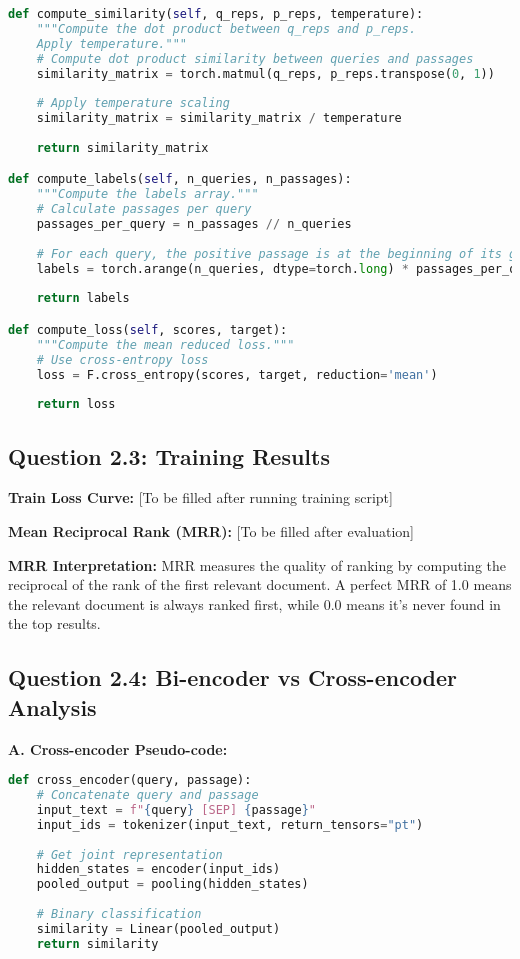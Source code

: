 \documentclass[11pt]{article}
\begin{document}
\begin{lstlisting}[language=Python]
def compute_similarity(self, q_reps, p_reps, temperature):
    """Compute the dot product between q_reps and p_reps.
    Apply temperature."""
    # Compute dot product similarity between queries and passages
    similarity_matrix = torch.matmul(q_reps, p_reps.transpose(0, 1))
    
    # Apply temperature scaling
    similarity_matrix = similarity_matrix / temperature
    
    return similarity_matrix

def compute_labels(self, n_queries, n_passages):
    """Compute the labels array."""
    # Calculate passages per query
    passages_per_query = n_passages // n_queries
    
    # For each query, the positive passage is at the beginning of its group
    labels = torch.arange(n_queries, dtype=torch.long) * passages_per_query
    
    return labels

def compute_loss(self, scores, target):
    """Compute the mean reduced loss."""
    # Use cross-entropy loss
    loss = F.cross_entropy(scores, target, reduction='mean')
    
    return loss
\end{lstlisting}

\subsection{Question 2.3: Training Results}

\textbf{Train Loss Curve:} [To be filled after running training script]

\textbf{Mean Reciprocal Rank (MRR):} [To be filled after evaluation]

\textbf{MRR Interpretation:} MRR measures the quality of ranking by computing the reciprocal of the rank of the first relevant document. A perfect MRR of 1.0 means the relevant document is always ranked first, while 0.0 means it's never found in the top results.

\subsection{Question 2.4: Bi-encoder vs Cross-encoder Analysis}

\textbf{A. Cross-encoder Pseudo-code:}

\begin{lstlisting}[language=Python]
def cross_encoder(query, passage):
    # Concatenate query and passage
    input_text = f"{query} [SEP] {passage}"
    input_ids = tokenizer(input_text, return_tensors="pt")
    
    # Get joint representation
    hidden_states = encoder(input_ids)
    pooled_output = pooling(hidden_states)
    
    # Binary classification
    similarity = Linear(pooled_output)
    return similarity
\end{lstlisting}
\end{document}
